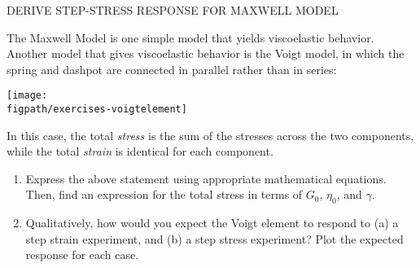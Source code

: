 \begin{activity}
\begin{exercises}
		\exercise \label{\labelbase:exc:maxwell} DERIVE STEP-STRESS RESPONSE FOR MAXWELL MODEL
		
		\exercise The Maxwell Model is one simple model that yields viscoelastic behavior.  Another model that gives viscoelastic behavior is the Voigt model, in which the spring and dashpot are connected in parallel rather than in series:
		
			\centerline{\texttt{[image: \\figpath/exercises-voigtelement]}}
			
			In this case, the total \emph{stress} is the sum of the stresses across the two components, while the total \emph{strain} is identical for each component.
			
			\begin{enumerate}
				\item Express the above statement using appropriate mathematical equations.  Then, find an expression for the total stress in terms of $G_0$, $\eta_0$, and $\gamma$.
				\item Qualitatively, how would you expect the Voigt element to respond to (a) a step strain experiment, and (b) a step stress experiment?  Plot the expected response for each case.
			\end{enumerate}
		
\end{exercises}
	
\end{activity}